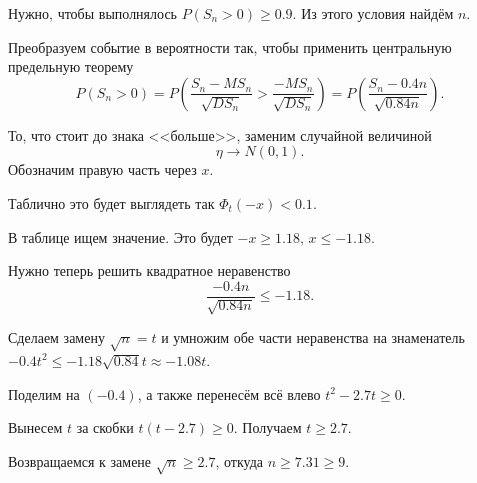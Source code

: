 Нужно, чтобы выполнялось $P \left( S_n > 0 \right) \geq 0.9$.
Из этого условия найдём $n$.

Преобразуем событие в вероятности так, чтобы применить центральную предельную теорему
$$P \left( S_n > 0 \right) =
  P \left( \frac{S_n - MS_n}{ \sqrt{DS_n}} > \frac{-MS_n}{ \sqrt{DS_n}} \right) =
  P \left( \frac{S_n - 0.4n}{ \sqrt{0.84n}} \right).$$

То, что стоит до знака <<больше>>, заменим случайной величиной
$$ \eta \to N \left( 0, 1 \right).$$
Обозначим правую часть через $x$.

Таблично это будет выглядеть так $ \Phi_t \left( -x \right) < 0.1$.

В таблице ищем значение.
Это будет $-x \geq 1.18, \, x \leq -1.18$.

Нужно теперь решить квадратное неравенство
$$ \frac{-0.4n}{ \sqrt{0.84n}} \leq -1.18.$$

Сделаем замену $ \sqrt{n} = t$ и умножим обе части неравенства на знаменатель
$-0.4t^2 \leq
  -1.18 \sqrt{0.84}t \approx
  -1.08t$.

Поделим на $ \left( -0.4 \right) $, а также перенесём всё влево $t^2 - 2.7t \geq 0$.

Вынесем $t$ за скобки $t \left( t - 2.7 \right) \geq 0$.
Получаем $t \geq 2.7$.

Возвращаемся к замене $ \sqrt{n} \geq 2.7$, откуда $n \geq 7.31 \geq 9$.

